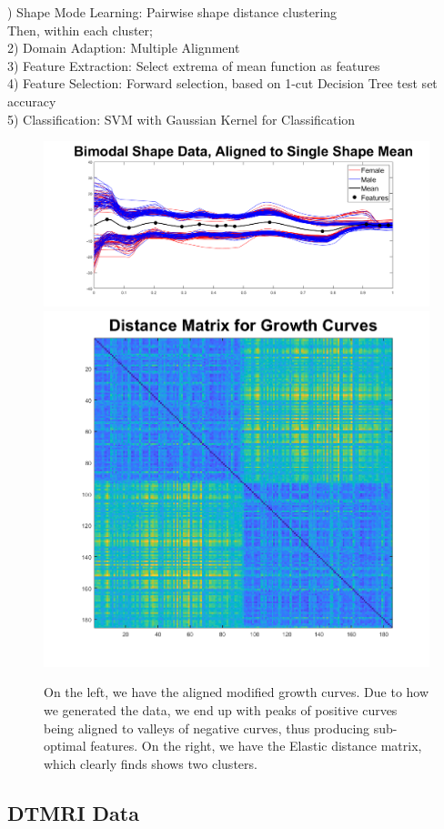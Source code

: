 \documentclass[]{article}
\begin{document}
) Shape Mode Learning: Pairwise shape distance clustering\\
Then, within each cluster;\\
2) Domain Adaption: Multiple Alignment\\
3) Feature Extraction: Select extrema of mean function as features\\
4) Feature Selection: Forward selection, based on 1-cut Decision Tree test set accuracy\\
5) Classification: SVM with Gaussian Kernel for Classification\\

\begin{figure}
	\includegraphics[width = .7\linewidth]{./Aligned_2_cluster.png}
	\includegraphics[width = .3\linewidth]{./Distance Matrix.png}
	\caption{On the left, we have the aligned modified growth curves. Due to how we generated the data, we end up with peaks of positive curves being aligned to valleys of negative curves, thus producing sub-optimal features. On the right, we have the Elastic distance matrix, which clearly finds shows two clusters. }
	\label{aligned function2}
\end{figure}

	

\subsection{DTMRI Data}\label{DTMRI}
\end{document}
